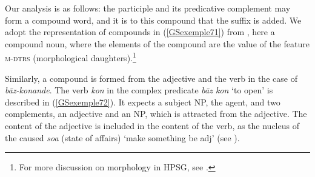 \noindent
Our analysis is as follows: the participle and its predicative complement may form a compound word, and it is to this compound that the suffix  is added. We adopt the representation of compounds in (\ref{GSexemple71}) from \citep[178]{bonami2018lexeme}, here a compound noun, where the elements of the compound are the value of the feature \textsc{m-dtrs} (morphological daughters).\footnote{For more discussion on morphology in HPSG, see .}

\ea
\label{GSexemple71}%
\z

\noindent
Similarly, a compound is formed from the adjective and the verb in the case of \emph{b\=az-konande}. The verb \emph{kon} in the complex predicate \emph{b\=az kon} `to open' is described in (\ref{GSexemple72}). It expects a subject NP, the agent, and two complements, an adjective and an NP, which is attracted from the adjective. The content of the adjective is included in the content of the verb, as the nucleus of the caused \emph{soa} (state of affairs) `make something be adj' (see \citealt[642]{MuellerPersian}).

